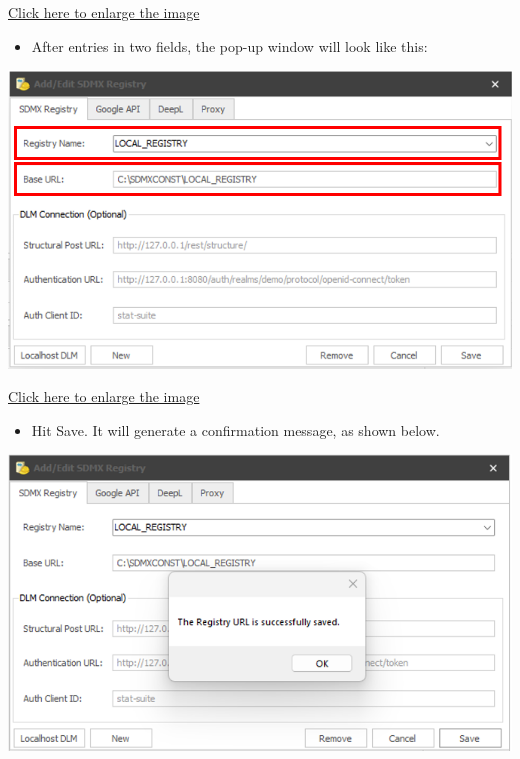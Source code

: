 \documentclass[
]{book}
\providecommand{\tightlist}{%
  \setlength{\itemsep}{0pt}\setlength{\parskip}{0pt}}
\theoremstyle{definition}
\theoremstyle{definition}
\theoremstyle{definition}
\theoremstyle{definition}
\theoremstyle{remark}
\begin{document}
\href{images/image052.png}{Click here to enlarge the image}

\begin{itemize}
\tightlist
\item
  After entries in two fields, the pop-up window will look like this:
\end{itemize}

\begin{center}\includegraphics[width=1\linewidth]{./images/image054} \end{center}

\href{images/image054.png}{Click here to enlarge the image}

\begin{itemize}
\tightlist
\item
  Hit Save. It will generate a confirmation message, as shown below.
\end{itemize}

\begin{center}\includegraphics[width=1\linewidth]{./images/image056} \end{center}
\end{document}
